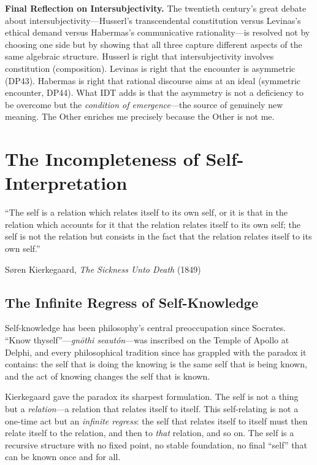 \begin{reflectionbox}
\noindent\textbf{Final Reflection on Intersubjectivity.}
The twentieth century's great debate about intersubjectivity---Husserl's
transcendental constitution versus Levinas's ethical demand versus
Habermas's communicative rationality---is resolved not by choosing one side
but by showing that all three capture different aspects of the same algebraic
structure.  Husserl is right that intersubjectivity involves constitution
(composition).  Levinas is right that the encounter is asymmetric (DP43).
Habermas is right that rational discourse aims at an ideal (symmetric encounter,
DP44).  What IDT adds is that the asymmetry is not a deficiency to be overcome
but the \emph{condition of emergence}---the source of genuinely new meaning.
The Other enriches me precisely because the Other is not me.
\end{reflectionbox}



\chapter{The Incompleteness of Self-Interpretation}
\label{ch:self-interpretation}

\epigraph{``The self is a relation which relates itself to its own self, or it
is that in the relation which accounts for it that the relation relates
itself to its own self; the self is not the relation but consists in the
fact that the relation relates itself to its own self.''}{S\o ren
Kierkegaard, \textit{The Sickness Unto Death} (1849)}

\section{The Infinite Regress of Self-Knowledge}

Self-knowledge has been philosophy's central preoccupation since Socrates.
``Know thyself''---\textit{gn\={o}thi seaut\'on}---was inscribed on the Temple
of Apollo at Delphi, and every philosophical tradition since has grappled with
the paradox it contains: the self that is doing the knowing is the same self
that is being known, and the act of knowing changes the self that is known.

Kierkegaard gave the paradox its sharpest formulation.  The self is not a thing
but a \emph{relation}---a relation that relates itself to itself.  This
self-relating is not a one-time act but an \emph{infinite regress}: the self
that relates itself to itself must then relate itself to the relation, and
then to \emph{that} relation, and so on.  The self is a recursive structure
with no fixed point, no stable foundation, no final ``self'' that can be known
once and for all.

